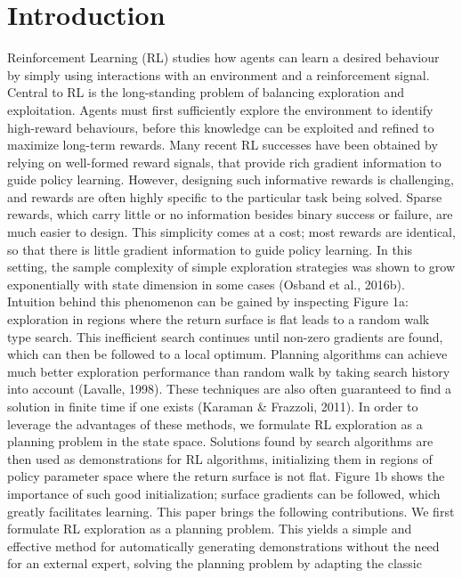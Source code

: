 \documentclass{article}
\begin{document}
\section{Introduction}
Reinforcement Learning (RL) studies how agents can learn a desired behaviour by simply using interactions with an environment and a reinforcement signal. Central to RL is the long-standing problem
of balancing exploration and exploitation. Agents must first sufficiently explore the environment to
identify high-reward behaviours, before this knowledge can be exploited and refined to maximize
long-term rewards. Many recent RL successes have been obtained by relying on well-formed reward
signals, that provide rich gradient information to guide policy learning. However, designing such
informative rewards is challenging, and rewards are often highly specific to the particular task being
solved. Sparse rewards, which carry little or no information besides binary success or failure, are
much easier to design. This simplicity comes at a cost; most rewards are identical, so that there is
little gradient information to guide policy learning. In this setting, the sample complexity of simple
exploration strategies was shown to grow exponentially with state dimension in some cases (Osband
et al., 2016b). Intuition behind this phenomenon can be gained by inspecting Figure 1a: exploration
in regions where the return surface is flat leads to a random walk type search. This inefficient search
continues until non-zero gradients are found, which can then be followed to a local optimum.
Planning algorithms can achieve much better exploration performance than random walk by taking
search history into account (Lavalle, 1998). These techniques are also often guaranteed to find a
solution in finite time if one exists (Karaman & Frazzoli, 2011). In order to leverage the advantages
of these methods, we formulate RL exploration as a planning problem in the state space. Solutions
found by search algorithms are then used as demonstrations for RL algorithms, initializing them in
regions of policy parameter space where the return surface is not flat. Figure 1b shows the importance
of such good initialization; surface gradients can be followed, which greatly facilitates learning.
This paper brings the following contributions. We first formulate RL exploration as a planning
problem. This yields a simple and effective method for automatically generating demonstrations
without the need for an external expert, solving the planning problem by adapting the classic
\end{document}
